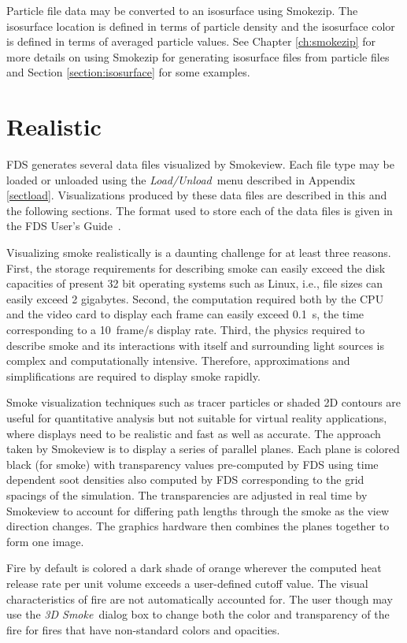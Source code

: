 \documentclass[11pt,twoside]{book}
\begin{document}
Particle file data may be converted to an isosurface using
Smokezip.  The isosurface location is defined in terms of particle
density and the isosurface color is defined in terms of averaged
particle values. See  Chapter \ref{ch:smokezip} for more details
on using Smokezip for generating isosurface files from particle
files and Section \ref{section:isosurface} for some examples.

\section{Realistic}
\label{section:volsmoke} FDS generates several data files
visualized by Smokeview. Each file type may be loaded or unloaded
using the {\em Load/Unload}\ menu described in Appendix
\ref{sectload}. Visualizations produced by these data files are
described in this and the following sections. The format used to
store each of the data files is given in the FDS User's
Guide~\cite{FDS_Users_Guide}.

Visualizing smoke realistically is a daunting challenge for at
least three reasons. First, the storage requirements for
describing smoke can easily exceed the disk capacities of present
32 bit operating systems such as Linux, i.e., file sizes can easily
exceed 2 gigabytes. Second, the computation required both by the
CPU and the video card to display each frame can easily exceed
0.1~s, the time corresponding to a 10~frame/s display rate. Third,
the physics required to describe smoke and its interactions with
itself and surrounding light sources is complex and
computationally intensive. Therefore, approximations and
simplifications are required to display smoke rapidly.

Smoke visualization techniques such as tracer particles or shaded
2D contours are useful for quantitative analysis but not suitable
for virtual reality applications, where displays need to be
realistic and fast as well as accurate. The approach taken by
Smokeview is to display a series of parallel planes.  Each plane
is colored black (for smoke) with transparency values pre-computed
by FDS using time dependent soot densities also computed by FDS
corresponding to the grid spacings of the simulation. The
transparencies are adjusted in real time by Smokeview to account
for differing path lengths through the smoke as the view direction
changes. The graphics hardware then combines the planes together
to form one image.

Fire by default is colored a dark shade of orange wherever the
computed heat release rate per unit volume exceeds a user-defined
cutoff value.  The visual characteristics of fire are not
automatically accounted for.  The user though may use the {\em 3D
Smoke}\ dialog box to change both the color and transparency of
the fire for fires that have non-standard colors and opacities.
\end{document}
